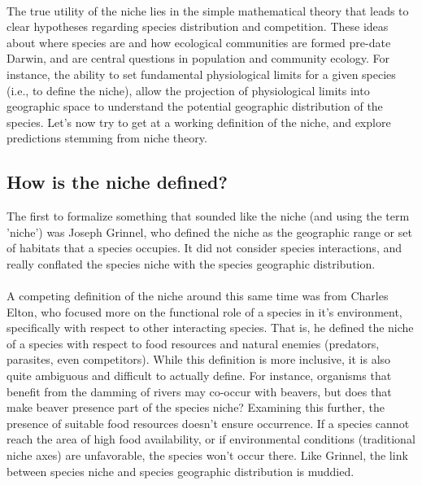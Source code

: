 \documentclass[12pt]{article}
\begin{document}
\paragraph*{}
The true utility of the niche lies in the simple mathematical theory that leads to clear hypotheses regarding species distribution and competition. These ideas about where species are and how ecological communities are formed pre-date Darwin, and are central questions in population and community ecology. For instance, the ability to set fundamental physiological limits for a given species (i.e., to define the niche), allow the projection of physiological limits into geographic space to understand the potential geographic distribution of the species. Let's now try to get at a working definition of the niche, and explore predictions stemming from niche theory. 












\subsection*{How is the niche defined?} 

The first to formalize something that sounded like the niche (and using the term 'niche') was Joseph Grinnel, who defined the niche as the geographic range or set of habitats that a species occupies. It did not consider species interactions, and really conflated the species niche with the species geographic distribution. 


\paragraph*{}
A competing definition of the niche around this same time was from Charles Elton, who focused more on the functional role of a species in it's environment, specifically with respect to other interacting species. That is, he defined the niche of a species with respect to food resources and natural enemies (predators, parasites, even competitors). While this definition is more inclusive, it is also quite ambiguous and difficult to actually define. For instance, organisms that benefit from the damming of rivers may co-occur with beavers, but does that make beaver presence part of the species niche? Examining this further, the presence of suitable food resources doesn't ensure occurrence. If a species cannot reach the area of high food availability, or if environmental conditions (traditional niche axes) are unfavorable, the species won't occur there. Like Grinnel, the link between species niche and species geographic distribution is muddied. 
\end{document}
